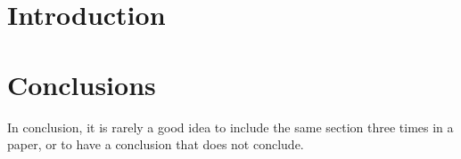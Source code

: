 \section{Introduction}

\section{Conclusions}

In conclusion, it is rarely a good idea to include the same section three times in a paper, or to have a conclusion that does not conclude.
